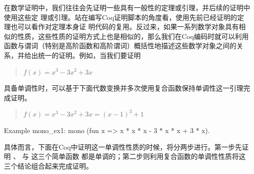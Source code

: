\documentclass{article}[margin=1pt]
\theoremstyle{definition}
\begin{document}
 在数学证明中，我们往往会先证明一些具有一般性的定理或引理，并后续的证明中使用这些定
    理或引理。站在编写Coq证明脚本的角度看，使用先前已经证明的定理也可以看作对定理本身证
    明代码的复用。反过来，如果一系列数学对象具有相似的性质，这些性质的证明方式上也是相似的，那么我们在Coq编码时就可以利用函数与谓词（特别是高阶函数和高阶谓词）概括性地描述这些数学对象之间的关系，并给出统一的证明。例如，当我们要证明
\begin{quotation}

     $f(x) = x^3 - 3x^2 + 3x$ 

\end{quotation}
 具备单调性时，可以基于下面代数变换并多次使用复合函数保持单调性这一引理完成证明。
\begin{quotation}

     $f(x) = x^3 - 3x^2 + 3x = (x - 1)^3 + 1$ 

\end{quotation}
\begin{mytext64}
Example mono_ex1: mono (fun x => x * x * x - 3 * x * x + 3 * x).



\end{mytext64}
\noindent
 具体而言，下面在Coq中证明这一单调性性质的时候，将分两步进行。第一步先证明
      、  与  这三个简单函数
    都是单调的；第二步则利用复合函数的单调性性质将这三个结论组合起来完成证明。
\end{document}
